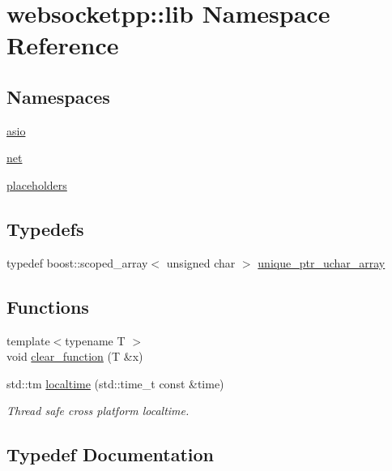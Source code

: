 \hypertarget{namespacewebsocketpp_1_1lib}{}\section{websocketpp\+:\+:lib Namespace Reference}
\label{namespacewebsocketpp_1_1lib}
\subsection*{Namespaces}
\begin{DoxyCompactItemize}
\item 
 \hyperlink{namespacewebsocketpp_1_1lib_1_1asio}{asio}
\item 
 \hyperlink{namespacewebsocketpp_1_1lib_1_1net}{net}
\item 
 \hyperlink{namespacewebsocketpp_1_1lib_1_1placeholders}{placeholders}
\end{DoxyCompactItemize}
\subsection*{Typedefs}
\begin{DoxyCompactItemize}
\item 
typedef boost\+::scoped\+\_\+array$<$ unsigned char $>$ \hyperlink{namespacewebsocketpp_1_1lib_a0021504e0fcd9438c7531506ccd95d94}{unique\+\_\+ptr\+\_\+uchar\+\_\+array}
\end{DoxyCompactItemize}
\subsection*{Functions}
\begin{DoxyCompactItemize}
\item 
{\footnotesize template$<$typename T $>$ }\\void \hyperlink{namespacewebsocketpp_1_1lib_ae781ac2d4191bb30a65742279cfdeca4}{clear\+\_\+function} (T \&x)
\item 
std\+::tm \hyperlink{namespacewebsocketpp_1_1lib_a1b873cb6baa3d85b57573bee059b29f4}{localtime} (std\+::time\+\_\+t const \&time)
\begin{DoxyCompactList}\small\item\em Thread safe cross platform localtime. \end{DoxyCompactList}\end{DoxyCompactItemize}


\subsection{Typedef Documentation}
\hypertarget{namespacewebsocketpp_1_1lib_a0021504e0fcd9438c7531506ccd95d94}{}
